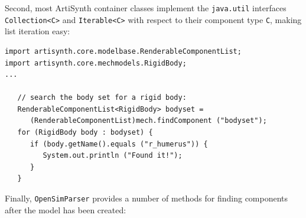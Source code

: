 Second, most ArtiSynth container classes implement the {\tt java.util}
interfaces {\tt Collection<C>} and {\tt Iterable<C>} with respect to their
component type {\tt C}, making list iteration easy:
%
\begin{lstlisting}[]
import artisynth.core.modelbase.RenderableComponentList;
import artisynth.core.mechmodels.RigidBody;
...

   // search the body set for a rigid body:
   RenderableComponentList<RigidBody> bodyset =
      (RenderableComponentList)mech.findComponent ("bodyset");
   for (RigidBody body : bodyset) {
      if (body.getName().equals ("r_humerus")) {
         System.out.println ("Found it!");
      }
   }
\end{lstlisting}
%
Finally, {\tt OpenSimParser} provides a number of methods for finding
components after the model has been created:

